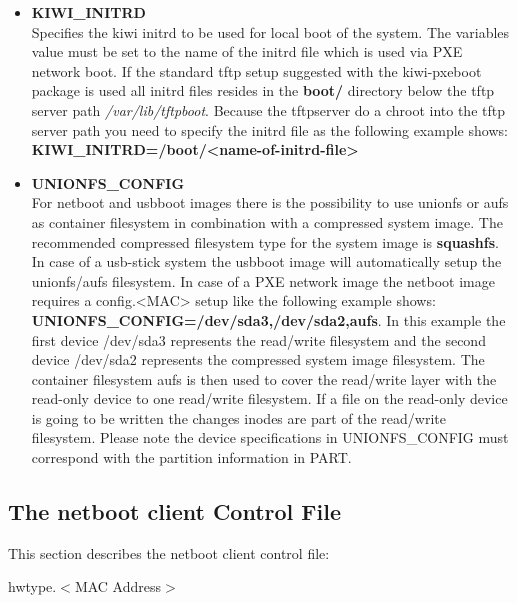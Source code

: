 \begin{itemize}
	\item \textbf{KIWI\_INITRD}\\
        Specifies the kiwi initrd to be used for local boot of the
        system. The variables value must be set to the name of the
        initrd file which is used via PXE network boot. If the
        standard tftp setup suggested with the kiwi-pxeboot package
        is used all initrd files resides in the \textbf{boot/} directory
        below the tftp server path \textit{/var/lib/tftpboot}. Because
        the tftpserver do a chroot into the tftp server path you need
        to specify the initrd file as the following example shows:
        \textbf{KIWI\_INITRD=/boot/<name-of-initrd-file>}
	\item \textbf{UNIONFS\_CONFIG}\\
		For netboot and usbboot images there is the possibility to
		use unionfs or aufs as container filesystem in combination
		with a compressed system image. The recommended compressed
		filesystem type for the system image is \textbf{squashfs}.
		In case of a usb-stick system the usbboot image will 
		automatically setup the unionfs/aufs filesystem. In case of
		a PXE network image the netboot image requires a config.<MAC>
		setup like the following example shows:
		\textbf{UNIONFS\_CONFIG=/dev/sda3,/dev/sda2,aufs}. In this
		example the first device /dev/sda3 represents the read/write
		filesystem and the second device /dev/sda2 represents the
		compressed system image filesystem. The container filesystem
		aufs is then used to cover the read/write layer with the
		read-only device to one read/write filesystem. If a file on
		the read-only device is going to be written the changes inodes
		are part of the read/write filesystem. Please note the device
		specifications in UNIONFS\_CONFIG must correspond with
		the partition information in PART.
\end{itemize}


\subsection{The netboot client Control File}
\label{section:cntrlhw}
This section describes the netboot client control file:

\begin{Command}{8cm}
hwtype.$<$MAC Address$>$
\end{Command}


